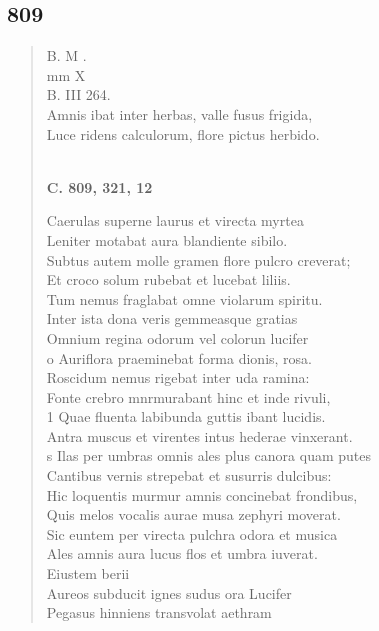 \documentclass[11pt, a4paper]{report}
\begin{document}
            \subsection*{809}
      \begin{verse}
      B. M . \\ mm X \\ B. III 264. \\ Amnis ibat inter herbas, valle fusus frigida, \\ Luce ridens calculorum, flore pictus herbido. \\ 
        ﻿\pagebreak 
    \begin{center} \textbf{C. 809, 321, 12} \end{center} \marginpar{[297]} Caerulas superne laurus et virecta myrtea \\ Leniter motabat aura blandiente sibilo. \\ Subtus autem molle gramen flore pulcro creverat; \\ Et croco solum rubebat et lucebat liliis. \\ Tum nemus fraglabat omne violarum spiritu. \\ Inter ista dona veris gemmeasque gratias \\ Omnium regina odorum vel colorun lucifer \\ o Auriflora praeminebat forma dionis, rosa. \\ Roscidum nemus rigebat inter uda ramina: \\ Fonte crebro mnrmurabant hinc et inde rivuli, \\ 1 Quae fluenta labibunda guttis ibant lucidis. \\ Antra muscus et virentes intus  \lbrack hederae \rbrack  vinxerant. \\ s Ilas per umbras omnis ales plus canora quam putes \\ Cantibus vernis strepebat et susurris dulcibus: \\ Hic loquentis murmur amnis concinebat frondibus, \\ Quis melos vocalis aurae musa zephyri moverat. \\ Sic euntem per virecta pulchra odora et musica \\ Ales amnis aura lucus flos et umbra iuverat. \\ Eiustem berii \\ Aureos subducit ignes sudus ora Lucifer \\ Pegasus hinniens transvolat aethram \\ 

\end{verse}
\end{document}
